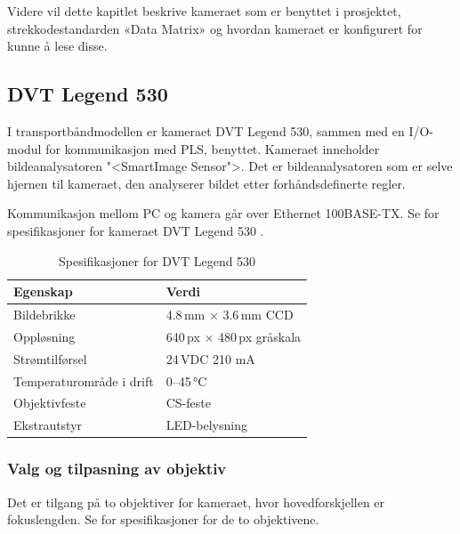 \documentclass[Visionprosjekt.tex]{subfiles}
\begin{document}
Videre vil dette kapitlet beskrive kameraet som er benyttet  i prosjektet, strekkodestandarden «Data Matrix» og  hvordan kameraet er konfigurert for kunne å lese disse.






\subsection{DVT Legend 530}
I transportbåndmodellen er kameraet DVT Legend 530, sammen med en I/O-modul for kommunikasjon med PLS, benyttet. Kameraet inneholder  bildeanalysatoren  "<\mbox{SmartImage} \mbox{Sensor}">. Det er bildeanalysatoren som er selve hjernen til kameraet, den analyserer bildet etter forhåndsdefinerte regler.



 Kommunikasjon mellom PC og kamera går over Ethernet 100BASE-TX. Se  for spesifikasjoner for kameraet DVT Legend 530 \cite{dvtlegend530}.

\begin{table}[ht]
    \centering
    \caption{Spesifikasjoner for DVT Legend 530}
    \label{tab:legend530}
    \begin{tabular}{ll}
    \toprule
        Egenskap        &   Verdi\\
    \midrule
        Bildebrikke	    &	4.8\,mm $\times$ 3.6\,mm CCD\\
        Oppløsning	    &	640\,px $\times$ 480\,px gråskala\\
        Strømtilførsel	&	24\,VDC 210 mA\\
        Temperaturområde i drift	&	0--45\,°C\\
        Objektivfeste	&	CS-feste\\
        Ekstrautstyr	&	LED-belysning\\
        \bottomrule
    \end{tabular}
\end{table}







\subsubsection{Valg og tilpasning av objektiv}


Det er tilgang på to objektiver for kameraet, hvor hovedforskjellen er fokuslengden. Se  for spesifikasjoner for de to objektivene.
\end{document}

